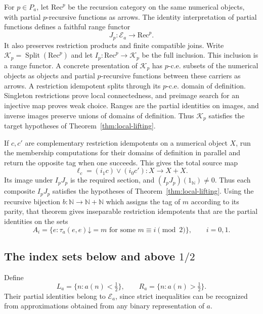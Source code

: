 \documentclass[11pt]{article}
\newcommand{\N}{\mathbb N}
\begin{document}
For $p\in P_a$, let $\mathrm{Rec}^{p}$ be the recursion category on
the same numerical objects, with partial $p$-recursive functions as
arrows. The identity interpretation of partial functions defines a
faithful range functor
\[
 J_p:\mathcal E_a\longrightarrow\mathrm{Rec}^{p}.
\]
It also preserves restriction products and finite compatible joins.
Write $\mathcal K_p=\operatorname{Split}(\mathrm{Rec}^{p})$ and let
$I_p:\mathrm{Rec}^{p}\to\mathcal K_p$ be the full inclusion.
This inclusion is a range functor.
A concrete presentation of $\mathcal K_p$ has $p$-c.e. subsets of the
numerical objects as objects and partial $p$-recursive functions between
these carriers as arrows. A restriction idempotent splits through its
$p$-c.e. domain of definition.
Singleton restrictions prove local connectedness, and preimage search
for an injective map proves weak choice. Ranges are the partial identities
on images, and inverse images preserve unions of domains of definition.
Thus $\mathcal K_p$ satisfies the target
hypotheses of Theorem~\ref{thm:local-lifting}.

If $c,c'$ are complementary restriction idempotents on a numerical
object $X$, run the membership computations for their domains of
definition in parallel and return the opposite tag when one succeeds.
This gives the total source map
\[
 \ell_c=(i_1c)\vee(i_0c'):X\longrightarrow X+X.
\]
Its image under $I_pJ_p$ is the required section, and
$(I_pJ_p)(1_{\N})\ne0$. Thus each composite
$I_pJ_p$ satisfies the hypotheses of Theorem~\ref{thm:local-lifting}.
Using the recursive bijection $b:\N\to\N+\N$ which assigns the tag
of $m$ according to its parity, that theorem gives inseparable
restriction idempotents that are the partial identities on the sets
\begin{equation}\label{eq:miller-diagonal-pair}
 A_i=\{e:\tau_a(e,e)\mathord\downarrow=m
                   \text{ for some }m\equiv i\pmod2\},
 \qquad i=0,1.
\end{equation}

\subsection{The index sets below and above \texorpdfstring{$1/2$}{1/2}}
\label{sec:miller-cuts}

Define
\[
 L_a=\{n:a(n)<\tfrac12\},\qquad
 R_a=\{n:a(n)>\tfrac12\}.
\]
Their partial identities belong to $\mathcal E_a$, since strict
inequalities can be recognized from approximations obtained from any
binary representation of $a$.
\end{document}
